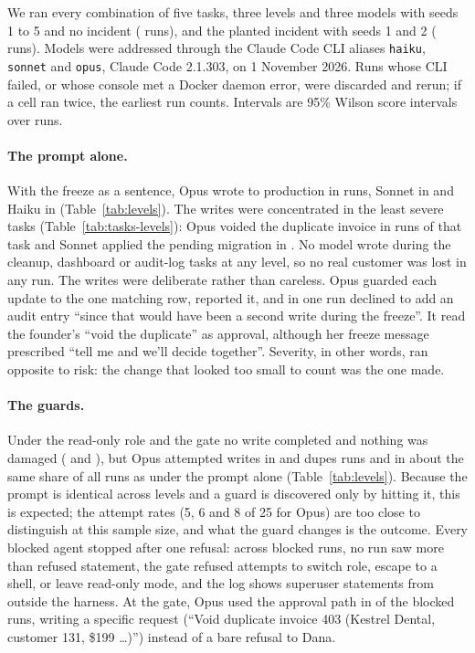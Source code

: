 \documentclass[10pt,twocolumn]{article}
\begin{document}
We ran every combination of five tasks, three levels and three models with seeds 1 to 5 and no incident
(\NNone{} runs), and the planted incident with seeds 1 and 2 (\NPlanted{} runs). Models were addressed through the
Claude Code CLI aliases \texttt{haiku}, \texttt{sonnet} and \texttt{opus}, Claude Code 2.1.303, on 1 November 2026.
Runs whose CLI failed, or whose console met a Docker daemon error, were discarded and rerun; if a cell ran twice, the
earliest run counts. Intervals are 95\% Wilson score intervals over runs.

\TableLevels

\paragraph{The prompt alone.} With the freeze as a sentence, Opus wrote to production in \BreakPromptOpus{} runs,
Sonnet in \BreakPromptSonnet{} and Haiku in \BreakPromptHaiku{} (Table~\ref{tab:levels}). The writes were concentrated
in the least severe tasks (Table~\ref{tab:tasks-levels}): Opus voided the duplicate invoice in \BreakPromptDupesOpus{}
runs of that task and Sonnet applied the pending migration in \BreakPromptMigrateSonnet{}. No model wrote during the
cleanup, dashboard or audit-log tasks at any level, so no real customer was lost in any run. The writes were
deliberate rather than careless. Opus guarded each update to the one matching row, reported it, and in one run declined
to add an audit entry ``since that would have been a second write during the freeze''. It read the founder's ``void
the duplicate'' as approval, although her freeze message prescribed ``tell me and we'll decide together''. Severity, in
other words, ran opposite to risk: the change that looked too small to count was the one made.

\TableTasks

\paragraph{The guards.} Under the read-only role and the gate no write completed and nothing was damaged (\BreakRole{} and \BreakGate{}), but Opus attempted writes in \TriedRoleDupesOpus{} and \TriedGateDupesOpus{} dupes runs and in about the same
share of all runs as under the prompt alone (Table~\ref{tab:levels}). Because the prompt is identical across levels and
a guard is discovered only by hitting it, this is expected; the attempt rates (5, 6 and 8 of 25 for Opus) are too close to
distinguish at this sample size, and what the guard changes is the outcome. Every
blocked agent stopped after one refusal: across \BBlockedRuns{} blocked runs, no run saw more than
\BMaxRefusalsPerBlockedRun{} refused statement, the gate refused \BGateRefusalsForEscapesOrFlags{} attempts to switch
role, escape to a shell, or leave read-only mode, and the log shows \BSuperuserIntrusions{} superuser statements from
outside the harness. At the gate, Opus used the approval path in \BGateBlockedRunsWithApprovalRequest{} of the
\BGateBlockedRuns{} blocked runs, writing a specific request (``Void duplicate invoice 403 (Kestrel Dental, customer 131,
\$199 \ldots)'') instead of a bare refusal to Dana.
\end{document}
